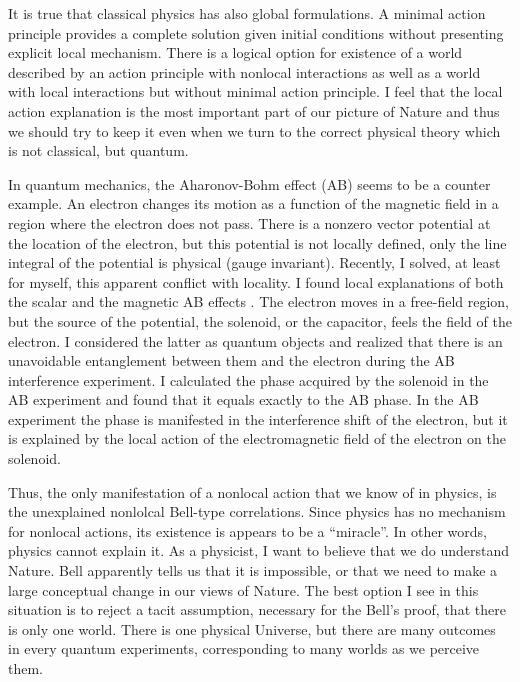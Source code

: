 \documentclass[11pt]{article}
\begin{document}
It is true that classical physics has also global formulations. A minimal action principle provides a complete solution given initial conditions without presenting explicit local mechanism.  There is a logical option for existence of a world  described by an action principle with nonlocal interactions as well as a world with local interactions but without minimal action principle. I feel that the local action explanation is the most important part of our picture of Nature and thus  we should try to keep it even when we turn to the correct physical theory which is not classical, but quantum.

In quantum mechanics,  the Aharonov-Bohm effect \cite{AB} (AB) seems to be a counter example. An electron changes its motion as a function of the magnetic field in a region where the electron does not pass. There is a nonzero vector potential at the location of the electron, but this potential  is not locally defined, only the line integral of the potential is physical (gauge invariant). Recently, I solved, at least for myself, this apparent conflict with locality. I found local explanations of both the scalar and the magnetic  AB effects \cite{VAB}. The electron moves in a free-field region, but the source of the potential, the solenoid, or the capacitor, feels the field of the electron. I considered the latter as  quantum objects and realized that there is an unavoidable entanglement between them and the electron during the AB interference experiment. I calculated the phase acquired by the solenoid in the AB experiment and found that it equals exactly to the AB phase. In the AB experiment the phase is manifested in the interference shift of the electron, but it is explained by the local action of the electromagnetic field of the electron on the solenoid.


Thus, the only manifestation of a nonlocal action  that we know of in physics, is the unexplained nonlolcal Bell-type correlations. Since physics has no mechanism for nonlocal actions, its existence is appears to be a ``miracle''. In other words, physics cannot explain it. As a physicist, I want to believe that we do understand Nature. Bell apparently tells us that it is impossible, or that we need to make a large conceptual change in our views of Nature. The best option I see in this situation is to reject a tacit assumption, necessary for the Bell's proof, that there is only one world. There is one physical Universe, but there are many outcomes in every quantum experiments, corresponding to many worlds as we perceive them.
\end{document}

